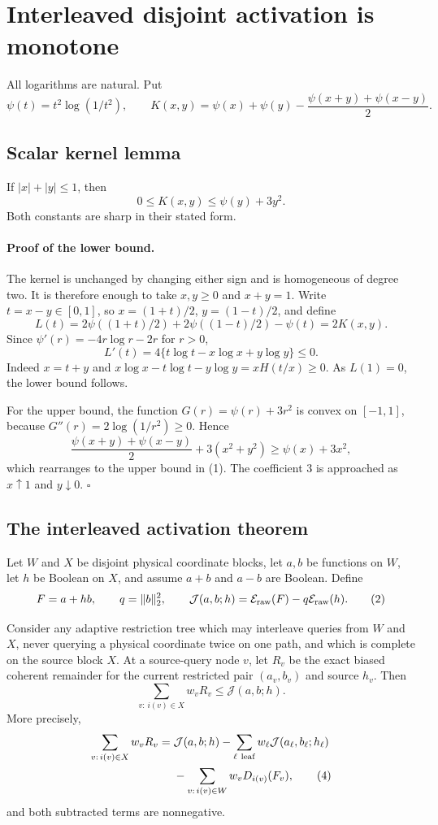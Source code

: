 \section*{Interleaved disjoint activation is monotone}

All logarithms are natural.  Put
\[
 \psi(t)=t^2\log(1/t^2),\qquad
 K(x,y)=\psi(x)+\psi(y)-\frac{\psi(x+y)+\psi(x-y)}2.
\]

\subsection*{Scalar kernel lemma}

If $|x|+|y|\le1$, then
\[
 0\le K(x,y)\le\psi(y)+3y^2.                         \tag{1}
\]
Both constants are sharp in their stated form.

\paragraph{Proof of the lower bound.}
The kernel is unchanged by changing either sign and is homogeneous of
degree two.  It is therefore enough to take $x,y\ge0$ and $x+y=1$.
Write $t=x-y\in[0,1]$, so $x=(1+t)/2$, $y=(1-t)/2$, and define
\[
 L(t)=2\psi((1+t)/2)+2\psi((1-t)/2)-\psi(t)=2K(x,y).
\]
Since $\psi'(r)=-4r\log r-2r$ for $r>0$,
\[
 L'(t)=4\{t\log t-x\log x+y\log y\}\le0.
\]
Indeed $x=t+y$ and
$x\log x-t\log t-y\log y=xH(t/x)\ge0$.  As $L(1)=0$, the lower bound
follows.

For the upper bound, the function $G(r)=\psi(r)+3r^2$ is convex on
$[-1,1]$, because $G''(r)=2\log(1/r^2)\ge0$.  Hence
\[
 \frac{\psi(x+y)+\psi(x-y)}2+3(x^2+y^2)
 \ge\psi(x)+3x^2,
\]
which rearranges to the upper bound in (1).  The coefficient $3$ is
approached as $x\uparrow1$ and $y\downarrow0$. \(\square\)

\subsection*{The interleaved activation theorem}

Let $W$ and $X$ be disjoint physical coordinate blocks, let $a,b$ be
functions on $W$, let $h$ be Boolean on $X$, and assume $a+b$ and $a-b$
are Boolean.  Define
\[
 F=a+hb,\qquad q=\|b\|_2^2,
 \qquad \mathcal J(a,b;h)=\mathcal E_{\rm raw}(F)
                         -q\mathcal E_{\rm raw}(h).                \tag{2}
\]

Consider any adaptive restriction tree which may interleave queries from
$W$ and $X$, never querying a physical coordinate twice on one path, and
which is complete on the source block $X$.  At a source-query node $v$,
let $R_v$ be the exact biased coherent remainder for the current restricted
pair $(a_v,b_v)$ and source $h_v$.  Then
\[
 \boxed{\sum_{v:\,i(v)\in X}w_vR_v\le\mathcal J(a,b;h).}          \tag{3}
\]
More precisely,
\begin{align*}
 \sum_{v:\,i(v)\in X}w_vR_v
  ={}&\mathcal J(a,b;h)
     -\sum_{\ell\ {\rm leaf}}w_\ell\mathcal J(a_\ell,b_\ell;h_\ell)\\
    &-\sum_{v:\,i(v)\in W}w_vD_{i(v)}(F_v),                       \tag{4}
\end{align*}
and both subtracted terms are nonnegative.

